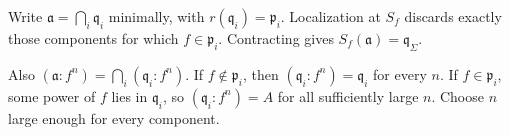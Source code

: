 Write $\mathfrak{a}=\bigcap_i\mathfrak{q}_i$ minimally, with $r(\mathfrak{q}_i)=\mathfrak{p}_i$. Localization at $S_f$ discards exactly those components for which $f\in\mathfrak{p}_i$. Contracting gives $S_f(\mathfrak{a})=\mathfrak{q}_{\Sigma}$.

Also $(\mathfrak{a}:f^n)=\bigcap_i(\mathfrak{q}_i:f^n)$. If $f\notin\mathfrak{p}_i$, then $(\mathfrak{q}_i:f^n)=\mathfrak{q}_i$ for every $n$. If $f\in\mathfrak{p}_i$, some power of $f$ lies in $\mathfrak{q}_i$, so $(\mathfrak{q}_i:f^n)=A$ for all sufficiently large $n$. Choose $n$ large enough for every component.

